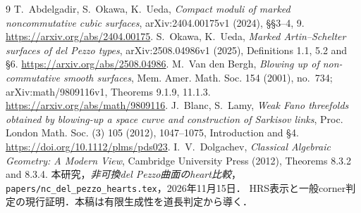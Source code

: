 \documentclass[11pt,a4paper]{ltjsarticle}
\theoremstyle{definition}\newtheorem{remark}[theorem]{注意}
\begin{document}
\begin{thebibliography}{9}
 T.~Abdelgadir, S.~Okawa, K.~Ueda,
\emph{Compact moduli of marked noncommutative cubic surfaces},
arXiv:2404.00175v1 (2024), \S\S3--4, 9.
\url{https://arxiv.org/abs/2404.00175}.
 S.~Okawa, K.~Ueda,
\emph{Marked Artin--Schelter surfaces of del Pezzo types},
arXiv:2508.04986v1 (2025), Definitions 1.1, 5.2 and \S6.
\url{https://arxiv.org/abs/2508.04986}.
 M.~Van den Bergh,
\emph{Blowing up of non-commutative smooth surfaces},
Mem. Amer. Math. Soc. 154 (2001), no.~734;
arXiv:math/9809116v1, Theorems 9.1.9, 11.1.3.
\url{https://arxiv.org/abs/math/9809116}.
 J.~Blanc, S.~Lamy,
\emph{Weak Fano threefolds obtained by blowing-up a space curve and construction of Sarkisov links},
Proc. London Math. Soc. (3) 105 (2012), 1047--1075, Introduction and \S4.
\url{https://doi.org/10.1112/plms/pds023}.
 I.~V.~Dolgachev,
\emph{Classical Algebraic Geometry: A Modern View},
Cambridge University Press (2012), Theorems 8.3.2 and 8.3.4.
 本研究，\emph{非可換del Pezzo曲面のheart比較}，
\texttt{papers/nc\_del\_pezzo\_hearts.tex}，2026年11月15日．
HRS表示と一般corner判定の現行証明．本稿は有限生成性を道長判定から導く．
\end{thebibliography}
\end{document}
